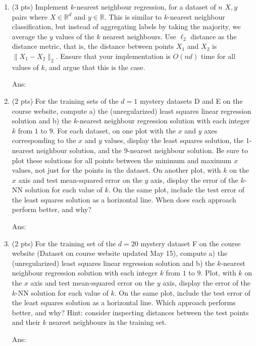\documentclass[10pt,letter,notitlepage]{article}
\newcommand{\red}[1]{{\color{red}#1}}
\newcommand{\ans}[1]{{\color{orange}\textsf{Ans}: #1}}
\newcounter{exercise}
\begin{document}
\begin{exercise}
  \begin{enumerate}
    \item (3 pts) Implement $k$-nearest neighbour regression, for a dataset of $n$ $X, y$ pairs where $X \in \mathbb{R}^d$ and $y \in \mathbb{R}$. 
      This is similar to $k$-nearest neighbour classification, but instead of aggregating labels by taking the majority, we average the $y$ values of the $k$ nearest neighbours.
      Use $\ell_2$ distance as the distance metric, that is, the distance between points $X_1$ and $X_2$ is $\|X_1 - X_2\|_2$.
      Ensure that your implementation is $O(nd)$ time for all values of $k$, and argue that this is the case.

    \ans{}
    \item (2 pts) For the training sets of the $d=1$ mystery datasets D and E on the course website, compute a) the (unregularized) least squares linear regression solution and b) the $k$-nearest neighbour regression solution with each integer $k$ from $1$ to $9$.
      For each dataset, on one plot with the $x$ and $y$ axes corresponding to the $x$ and $y$ values, display the least squares solution, the $1$-nearest neighbour solution, and the $9$-nearest neighbour solution. 
      Be sure to plot these solutions for all points between the minimum and maximum $x$ values, not just for the points in the dataset.
      On another plot, with $k$ on the $x$ axis and test mean-squared error on the $y$ axis, display the error of the $k$-NN solution for each value of $k$. 
      On the same plot, include the test error of the least squares solution as a horizontal line.
      When does each approach perform better, and why? 

    \ans{}
    \item (2 pts) For the training set of the $d = 20$ mystery dataset F on the course website (\red{Dataset on course website updated May 15}), compute a) the (unregularized) least squares linear regression solution and b) the $k$-nearest neighbour regression solution with each integer $k$ from $1$ to $9$.
      Plot, with $k$ on the $x$ axis and test mean-squared error on the $y$ axis, display the error of the $k$-NN solution for each value of $k$. 
      On the same plot, include the test error of the least squares solution as a horizontal line.
      Which approach performs better, and why? 
      Hint: consider inspecting distances between the test points and their $k$ nearest neighbours in the training set.

    \ans{}
  \end{enumerate}
\end{exercise}
\end{document}
